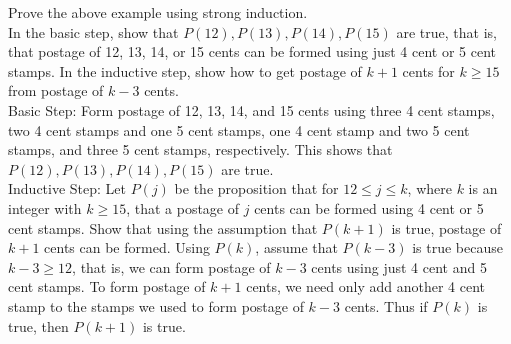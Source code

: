 \documentclass[12pt]{article}
\begin{document}
\begin{example} Prove the above example using strong induction. \\ 
In the basic step, show that $P(12), P(13), P(14), P(15)$ are true, that is, that postage of 12, 13, 14, or 15 cents can be formed using just 4 cent or 5 cent stamps. In the inductive step, show how to get postage of $k + 1$ cents for $k \geq 15$ from postage of $k - 3$ cents. \\ 
Basic Step: Form postage of 12, 13, 14, and 15 cents using three 4 cent stamps, two 4 cent stamps and one 5 cent stamps, one 4 cent stamp and two 5 cent stamps, and three 5 cent stamps, respectively. This shows that $P(12), P(13), P(14), P(15)$ are true. \\ 
Inductive Step: Let $P(j)$ be the proposition that for $12 \leq j \leq k$, where $k$ is an integer with $k \geq 15$, that a postage of $j$ cents can be formed using 4 cent or 5 cent stamps. Show that using the assumption that $P(k + 1)$ is true, postage of $k + 1$ cents can be formed. Using $P(k)$, assume that $P(k - 3)$ is true because $k - 3 \geq 12$, that is, we can form postage of $k - 3$ cents using just 4 cent and 5 cent stamps. To form postage of $k + 1$ cents, we need only add another 4 cent stamp to the stamps we used to form postage of $k - 3$ cents. Thus if $P(k)$ is true, then $P(k + 1)$ is true. \end{example} 
\end{document}
